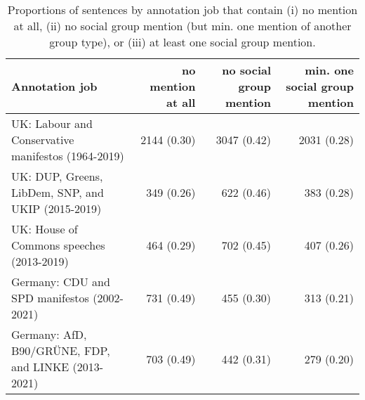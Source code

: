 \begin{table}[!t]

\caption{\label{tab:prop_mentions_by_job}Proportions of sentences by annotation job that contain (i) no mention at all, (ii) no social group mention (but min. one mention of another group type), or (iii) at least one social group mention.}
\centering
\fontsize{10}{12}\selectfont
\begin{tabular}[t]{lrrr}
\toprule
Annotation job & no mention at all & no social group mention & min. one social group mention\\
\midrule
UK: Labour and Conservative manifestos (1964-2019) & 2144 (0.30) & 3047 (0.42) & 2031 (0.28)\\
UK: DUP, Greens, LibDem, SNP, and UKIP (2015-2019) & 349 (0.26) & 622 (0.46) & 383 (0.28)\\
UK: House of Commons speeches (2013-2019) & 464 (0.29) & 702 (0.45) & 407 (0.26)\\
Germany: CDU and SPD manifestos (2002-2021) & 731 (0.49) & 455 (0.30) & 313 (0.21)\\
Germany: AfD, B90/GRÜNE, FDP, and LINKE (2013-2021) & 703 (0.49) & 442 (0.31) & 279 (0.20)\\
\bottomrule
\end{tabular}
\end{table}
